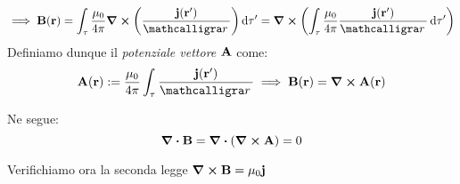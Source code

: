 \documentclass[12pt,a4paper]{article}
\begin{document}
\begin{equation*}
    \implies \vb{B}(\vb{r})= \int_\tau\frac{\mu_0}{4\pi}\curl(\frac{\vb{j}(\vb{r}')}{\scriptr})\dd{\tau'}= \curl(\int_\tau\frac{\mu_0}{4\pi}\frac{\vb{j}(\vb{r}')}{\scriptr}\dd{\tau'})
\end{equation*}
Definiamo dunque il \textit{potenziale vettore} $\vb{A}$ come:
\begin{equation*}
    \vb{A}(\vb{r}):=\frac{\mu_0}{4\pi}\int_\tau \frac{\vb{j}(\vb{r}')}{\scriptr}\implies\vb{B}(\vb{r})= \curl{\vb{A}(\vb{r})}
\end{equation*}

Ne segue:
\begin{equation*}
    \div\vb{B}= \div(\curl{\vb{A}})= 0
\end{equation*}

Verifichiamo ora la seconda legge $\curl{\vb{B}}= \mu_0\vb{j}$
\end{document}
